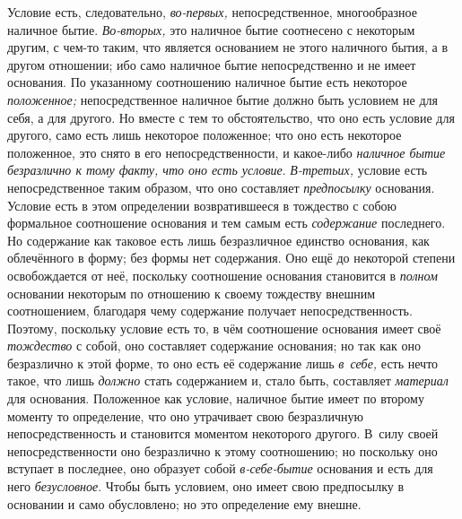 Условие есть, следовательно, {\em во-первых,}
непосредственное, многообразное наличное бытие.
{\em Во-вторых,} это наличное бытие соотнесено с
некоторым другим, с чем-то таким, что является основанием не этого
наличного бытия, а в другом отношении; ибо само наличное бытие
непосредственно и не имеет основания. По указанному соотношению наличное
бытие есть некоторое {\em положенное;} непосредственное
наличное бытие должно быть условием не для себя, а для другого. Но вместе с
тем то обстоятельство, что оно есть условие для другого, само есть лишь
некоторое положенное; что оно есть некоторое положенное, это снято в его
непосредственности, и какое-либо {\em наличное бытие
безразлично к тому факту, что оно есть условие}.
{\em В-третьих,} условие есть непосредственное таким
образом, что оно составляет {\em предпосылку}
основания. Условие есть в этом определении возвратившееся в тождество с
собою формальное соотношение основания и тем самым есть
{\em содержание} последнего. Но содержание как таковое
есть лишь безразличное единство основания, как облечённого в форму; без
формы нет содержания. Оно ещё до некоторой степени освобождается от неё,
поскольку соотношение основания становится в
{\em полном} основании некоторым по отношению к своему
тождеству внешним соотношением, благодаря чему содержание получает
непосредственность. Поэтому, поскольку условие есть то, в чём соотношение
основания имеет своё {\em тождество} с собой, оно
составляет содержание основания; но так как оно безразлично к этой форме,
то оно есть её содержание лишь {\em в~себе,} есть нечто
такое, что лишь {\em должно} стать содержанием и, стало
быть, составляет {\em материал} для основания.
Положенное как условие, наличное бытие имеет по второму моменту то
определение, что оно утрачивает свою безразличную непосредственность и
становится моментом некоторого другого. В~силу своей непосредственности оно
безразлично к этому соотношению; но поскольку оно вступает в последнее, оно
образует собой {\em в-себе-бытие} основания и есть для
него {\em безусловное}. Чтобы быть условием, оно имеет
свою предпосылку в основании и само обусловлено; но это определение ему внешне.

